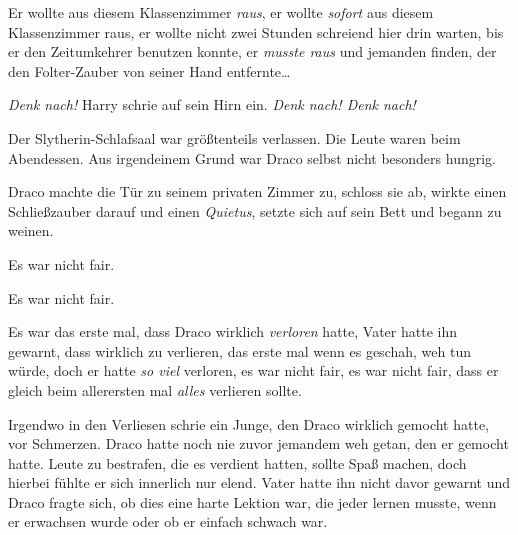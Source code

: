 Er wollte aus diesem Klassenzimmer \emph{raus}, er wollte \emph{sofort} aus diesem Klassenzimmer raus, er wollte nicht zwei Stunden schreiend hier drin warten, bis er den Zeitumkehrer benutzen konnte, er \emph{musste raus} und jemanden finden, der den Folter-Zauber von seiner Hand entfernte…

\emph{Denk nach!} Harry schrie auf sein Hirn ein. \emph{Denk nach! Denk nach!}

\later

Der Slytherin-Schlafsaal war größtenteils verlassen. Die Leute waren beim Abendessen. Aus irgendeinem Grund war Draco selbst nicht besonders hungrig.

Draco machte die Tür zu seinem privaten Zimmer zu, schloss sie ab, wirkte einen Schließzauber darauf und einen \emph{Quietus}, setzte sich auf sein Bett und begann zu weinen.

Es war nicht fair.

Es war nicht fair.

Es war das erste mal, dass Draco wirklich \emph{verloren} hatte, Vater hatte ihn gewarnt, dass wirklich zu verlieren, das erste mal wenn es geschah, weh tun würde, doch er hatte \emph{so viel} verloren, es war nicht fair, es war nicht fair, dass er gleich beim allerersten mal \emph{alles} verlieren sollte.

Irgendwo in den Verliesen schrie ein Junge, den Draco wirklich gemocht hatte, vor Schmerzen. Draco hatte noch nie zuvor jemandem weh getan, den er gemocht hatte. Leute zu bestrafen, die es verdient hatten, sollte Spaß machen, doch hierbei fühlte er sich innerlich nur elend. Vater hatte ihn nicht davor gewarnt und Draco fragte sich, ob dies eine harte Lektion war, die jeder lernen musste, wenn er erwachsen wurde oder ob er einfach schwach war.

